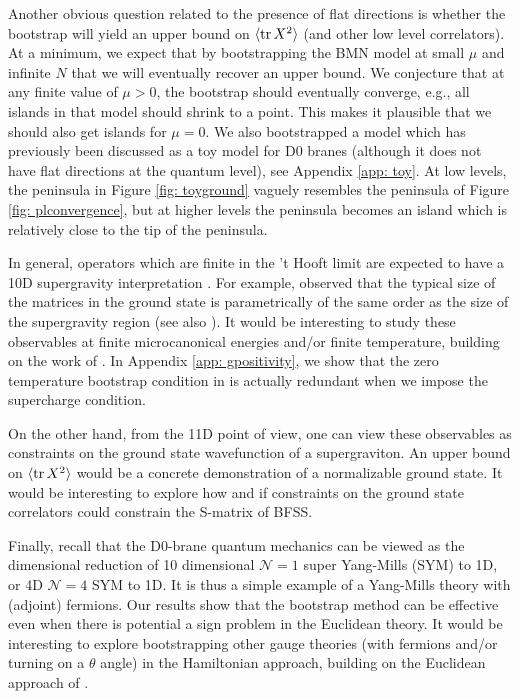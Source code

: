 \documentclass[11pt]{article}
\renewcommand{\ev}[1]{\langle #1 \rangle} %
\begin{document}
Another obvious question related to the presence of flat directions is whether the bootstrap will yield an upper bound on $\ev{\tr X^2}$ (and other low level correlators). At a minimum, we expect that by bootstrapping the BMN model \cite{Berenstein:2002jq} at small $\mu$ and infinite $N$ that we will eventually recover an upper bound. We conjecture that at any finite value of $\mu > 0$, the bootstrap should eventually converge, e.g., all islands in that model should shrink to a point. This makes it plausible that we should also get islands for $\mu = 0$. We also bootstrapped a model which has previously been discussed as a toy model for D0 branes (although it does not have flat directions at the quantum level), see Appendix \ref{app: toy}. At low levels, the peninsula in Figure \ref{fig: toyground} vaguely resembles the peninsula of Figure \ref{fig: plconvergence}, but at higher levels the peninsula becomes an island which is relatively close to the tip of the peninsula.



In general, operators which are finite in the
't Hooft limit are expected to have a 10D supergravity interpretation \cite{Itzhaki:1998dd}. %
For example, \cite{Polchinski:1999br, Lin:2023owt} observed that the typical size of the matrices in the ground state is parametrically of the same order as the size of the supergravity region (see also \cite{Hanada:2021ipb}). It would be interesting to study these observables at finite microcanonical energies \cite{Lin:2023owt} and/or finite temperature, building on the work of \cite{Fawzi:2023fpg, Cho:2024kxn}. In Appendix \ref{app: gpositivity}, we show that the zero temperature bootstrap condition in \cite{Fawzi:2023fpg} is actually redundant when we impose the supercharge condition.

On the other hand, from the 11D point of view, one can view these observables as constraints on the ground state wavefunction of a supergraviton. An upper bound on $\ev{\tr X^2}$ would be a concrete demonstration of a normalizable ground state. It would be interesting to explore how and if constraints on the ground state correlators could constrain the S-matrix of BFSS. 










Finally, recall that the D0-brane quantum mechanics can be viewed as the dimensional reduction of 10 dimensional $\mathcal{N}=1$ super Yang-Mills (SYM) to 1D, or 4D $\mathcal{N}=4$ SYM to 1D. It is thus a simple example of a Yang-Mills theory with (adjoint) fermions. 
Our results show that the bootstrap method can be effective even when there is potential a sign problem in the Euclidean theory. It would be interesting to explore bootstrapping other gauge theories (with fermions and/or turning on a $\theta$ angle) in the Hamiltonian approach, building on the Euclidean approach of \cite{Anderson:2016rcw, Kazakov:2022xuh, Kazakov:2024ool}. 
\end{document}
